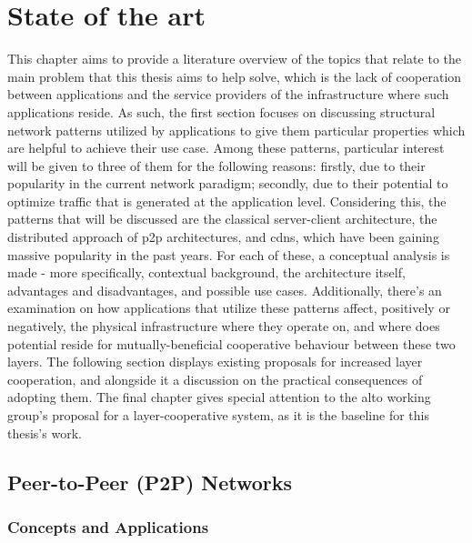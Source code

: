 \chapter{State of the art}

\label{sec:state-of-art}


    This chapter aims to provide a literature overview of the topics that relate to the main problem that this thesis aims to help solve, which is the lack of cooperation between applications and the service providers of the infrastructure where such applications reside.
    As such, the first section focuses on discussing structural network patterns utilized by applications to give them particular properties which are helpful to achieve their use case.
    Among these patterns, particular interest will be given to three of them for the following reasons: firstly, due to their popularity in the current network paradigm; secondly, due to their potential to optimize traffic that is generated at the application level.
    Considering this, the patterns that will be discussed are the classical server-client architecture, the distributed approach of \gls{p2p} architectures, and \glspl{cdn}, which have been gaining massive popularity in the past years.
    For each of these, a conceptual analysis is made - more specifically, contextual background, the architecture itself, advantages and disadvantages, and possible use cases.
    Additionally, there's an examination on how applications that utilize these patterns affect, positively or negatively, the physical infrastructure where they operate on, and where does potential reside for mutually-beneficial cooperative behaviour between these two layers.
    The following section displays existing proposals for increased layer cooperation, and alongside it a discussion on the practical consequences of adopting them.
    The final chapter gives special attention to the \gls{alto} working group's proposal for a layer-cooperative system, as it is the baseline for this thesis's work.

\section{Peer-to-Peer (P2P) Networks}

\subsection{Concepts and Applications}

